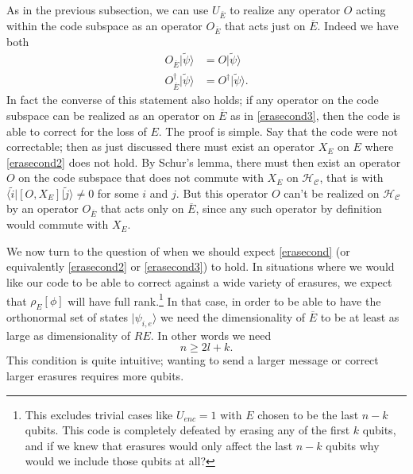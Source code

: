 \documentclass[12pt]{article}
\newcommand{\be}{\begin{equation}}
\newcommand{\ee}{\end{equation}}
\newcommand{\HC}{\mathcal{H}_{\mathcal{C}}}
\newcommand{\lan}{\langle}
\newcommand{\ran}{\rangle}
\newcommand{\wt}{\widetilde}
\begin{document}
As in the previous subsection, we can use $U_{\overline{E}}$ to realize any operator $O$ acting within the code subspace as an operator $O_{\overline{E}}$ that acts just on $\overline{E}$.  Indeed we have both
\begin{align}\nonumber
O_{\overline{E}}|\wt{\psi}\ran&=O|\wt{\psi}\ran\\
O_{\overline{E}}^\dagger|\wt{\psi}\ran&=O^\dagger|\wt{\psi}\ran.\label{erasecond3}
\end{align}
In fact the converse of this statement also holds; if any operator on the code subspace can be realized as an operator on $\overline{E}$ as in \eqref{erasecond3}, then the code is able to correct for the loss of $E$.  The proof is simple. Say that the code were not correctable; then as just discussed there must exist an operator $X_E$ on $E$ where \eqref{erasecond2} does not hold.  By Schur's lemma, there must then exist an operator $O$ on the code subspace that does not commute with $X_E$ on $\HC$, that is with $\lan\wt{i}|[O,X_E]|\wt{j}\ran\neq 0$ for some $i$ and $j$.  But this operator $O$ can't be realized on $\HC$ by an operator $O_{\overline{E}}$ that acts only on $\overline{E}$, since any such operator by definition would commute with $X_E$.  
 
We now turn to the question of when we should expect \eqref{erasecond} (or equivalently \eqref{erasecond2} or \eqref{erasecond3}) to hold.  In situations where we would like our code to be able to correct against a wide variety of erasures, we expect that $\rho_E[\phi]$ will have full rank.\footnote{This excludes trivial cases like $U_{enc}=1$ with $E$ chosen to be the last $n-k$ qubits.  This code is completely defeated by erasing any of the first $k$ qubits, and if we knew that erasures would only affect the last $n-k$ qubits why would we include those qubits at all?}  In that case, in order to be able to have the orthonormal set of states $|\psi_{i,e}\ran$ we need the dimensionality of $\overline{E}$ to be at least as large as dimensionality of $RE$.  In other words we need
\be\label{lcond}
n\geq2l+k.
\ee
This condition is quite intuitive; wanting to send a larger message or correct larger erasures requires more qubits.  
\end{document}
